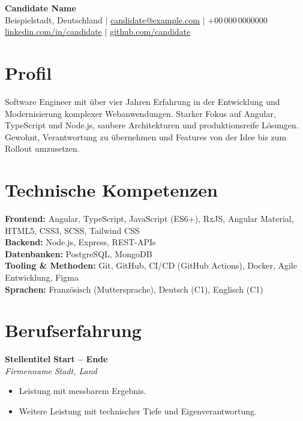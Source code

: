 \documentclass[a4paper,11pt]{article}
\begin{document}
\begin{center}
   {\LARGE\bfseries Candidate Name} \\[4pt]
   Beispielstadt, Deutschland \enspace$\vert$\enspace
   \href{mailto:candidate@example.com}{candidate@example.com} \enspace$\vert$\enspace
   +00\,000\,0000000 \\[2pt]
   \href{https://linkedin.com/in/candidate}{linkedin.com/in/candidate} \enspace$\vert$\enspace
   \href{https://github.com/candidate}{github.com/candidate}
\end{center}

\section{Profil}

Software Engineer mit über vier Jahren Erfahrung in der Entwicklung und Modernisierung komplexer Webanwendungen. Starker Fokus auf Angular, TypeScript und Node.js, saubere Architekturen und produktionsreife Lösungen. Gewohnt, Verantwortung zu übernehmen und Features von der Idee bis zum Rollout umzusetzen.

\section{Technische Kompetenzen}

\textbf{Frontend:} Angular, TypeScript, JavaScript (ES6+), RxJS, Angular Material, HTML5, CSS3, SCSS, Tailwind CSS \\
\textbf{Backend:} Node.js, Express, REST-APIs \\
\textbf{Datenbanken:} PostgreSQL, MongoDB \\
\textbf{Tooling \& Methoden:} Git, GitHub, CI/CD (GitHub Actions), Docker, Agile Entwicklung, Figma \\
\textbf{Sprachen:} Französisch (Muttersprache), Deutsch (C1), Englisch (C1)

\section{Berufserfahrung}

\textbf{Stellentitel} \hfill \textbf{Start -- Ende} \\
\textit{Firmenname} \hfill \textit{Stadt, Land}
\begin{itemize}
   \item Leistung mit messbarem Ergebnis.
   \item Weitere Leistung mit technischer Tiefe und Eigenverantwortung.
\end{itemize}
\end{document}
